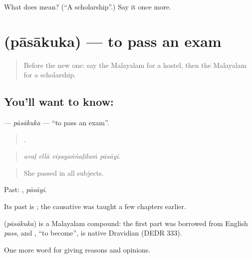 \begin{tcolorbox}[breakable,colback=teal!4,colframe=teal!35!black,title={Before you move on}]
What does  mean? (\textquotedblleft{}A scholarship\textquotedblright{}.) Say it once more.
\end{tcolorbox}
\section[\texorpdfstring{\ml{പാസാകുക} (pāsākuka)}{പാസാകുക (pāsākuka)}]{ (pāsākuka) — to pass an exam}

\label{lesson:ML-C434-pasakuka}



\begin{quote}
Before the new one: say the Malayalam for a hostel, then the Malayalam for a scholarship.
\end{quote}

\subsection*{You'll want to know: }
\textbf{} — \emph{pāsākuka} — \textquotedblleft{}to pass an exam\textquotedblright{}.

\begin{quote}
   .
\end{quote}

\begin{quote}
\emph{avaḷ ellā viṣayaṅṅaḷiluṁ pāsāyi.}
\end{quote}

\begin{quote}
She passed in all subjects.
\end{quote}

Past: , \emph{pāsāyi}.

Its past is ; the causative  was taught a few chapters earlier.

\begin{cousinweb}
\textbf{} (\emph{pāsākuka}) is a Malayalam compound: the first part was borrowed from English \emph{pass}, and , \textquotedblleft{}to become\textquotedblright{}, is native Dravidian (DEDR 333).
\end{cousinweb}

\begin{grammarlens}[title={What you've built}]
One more word for giving reasons and opinions.
\end{grammarlens}

